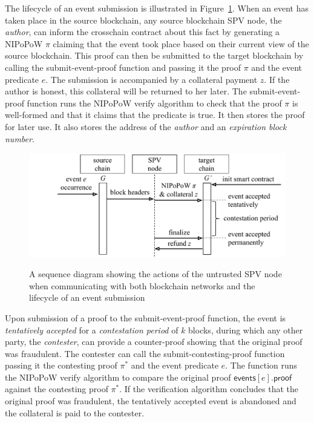 The lifecycle of an event submission is illustrated in
Figure~\ref{fig.sequence}. When an event has taken place in the source
blockchain, any source blockchain SPV node, the \emph{author}, can inform the
\textsf{crosschain} contract about this fact by generating a NIPoPoW $\pi$
claiming that the event took place based on their current view of the source
blockchain. This proof can then be submitted to the target blockchain by calling
the \textsf{submit-event-proof} function and passing it the proof $\pi$ and the
event predicate $e$. The submission is accompanied by a collateral payment $z$.
If the author is honest, this collateral will be returned to her later. The
\textsf{submit-event-proof} function runs the NIPoPoW \textsf{verify} algorithm
to check that the proof $\pi$ is well-formed and that it claims that the
predicate is \textsf{true}. It then stores the proof for later use. It also
stores the address of the \emph{author} and an \emph{expiration block number}.

\begin{figure}[H]
    \caption{A sequence diagram showing the actions of the untrusted SPV node
             when communicating with both blockchain networks and the lifecycle
             of an event submission}
    \centering
    \includegraphics[width=0.9 \columnwidth,keepaspectratio]{chapters/sidechains/figures/sequence-diagram.pdf}
    \label{fig.sequence}
\end{figure}

Upon submission of a proof to the \textsf{submit-event-proof} function, the
event is \emph{tentatively accepted} for a \emph{contestation period} of $k$
blocks, during which any other party, the \emph{contester}, can provide a
counter-proof showing that the original proof was fraudulent. The contester can
call the \textsf{submit-contesting-proof} function passing it the contesting
proof $\pi^*$ and the event predicate $e$. The function runs the NIPoPoW
\textsf{verify} algorithm to compare the original proof
$\textsf{events}[e].\textsf{proof}$ against the contesting proof $\pi^*$. If the
verification algorithm concludes that the original proof was fraudulent, the
tentatively accepted event is abandoned and the collateral is paid to the
contester.

